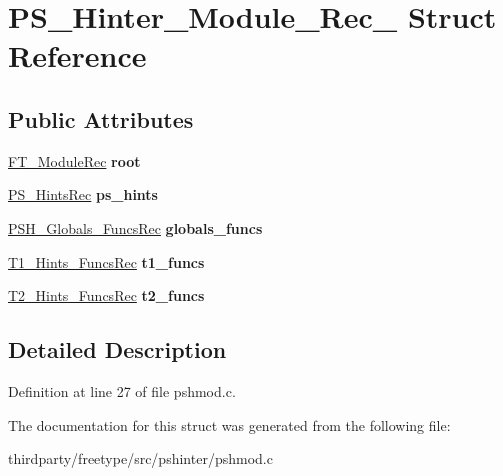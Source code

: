\hypertarget{struct_p_s___hinter___module___rec__}{}\section{P\+S\+\_\+\+Hinter\+\_\+\+Module\+\_\+\+Rec\+\_\+ Struct Reference}
\label{struct_p_s___hinter___module___rec__}
\subsection*{Public Attributes}
\begin{DoxyCompactItemize}
\item 
\mbox{\label{struct_p_s___hinter___module___rec___a8bf8cd4d78b4f2b21b2f066c1544e0f5}} 
\hyperlink{struct_f_t___module_rec__}{F\+T\+\_\+\+Module\+Rec} {\bfseries root}
\item 
\mbox{\label{struct_p_s___hinter___module___rec___a78af21517f974c2f96bf09fd146c9835}} 
\hyperlink{struct_p_s___hints_rec__}{P\+S\+\_\+\+Hints\+Rec} {\bfseries ps\+\_\+hints}
\item 
\mbox{\label{struct_p_s___hinter___module___rec___a2cee2883441a832ec90fef2f88a9f7a0}} 
\hyperlink{struct_p_s_h___globals___funcs_rec__}{P\+S\+H\+\_\+\+Globals\+\_\+\+Funcs\+Rec} {\bfseries globals\+\_\+funcs}
\item 
\mbox{\label{struct_p_s___hinter___module___rec___ad28fed56d50ab35983e0731974d0b045}} 
\hyperlink{struct_t1___hints___funcs_rec__}{T1\+\_\+\+Hints\+\_\+\+Funcs\+Rec} {\bfseries t1\+\_\+funcs}
\item 
\mbox{\label{struct_p_s___hinter___module___rec___a16794782a20aaaf1947537433381372e}} 
\hyperlink{struct_t2___hints___funcs_rec__}{T2\+\_\+\+Hints\+\_\+\+Funcs\+Rec} {\bfseries t2\+\_\+funcs}
\end{DoxyCompactItemize}


\subsection{Detailed Description}


Definition at line 27 of file pshmod.\+c.



The documentation for this struct was generated from the following file\+:\begin{DoxyCompactItemize}
\item 
thirdparty/freetype/src/pshinter/pshmod.\+c\end{DoxyCompactItemize}
